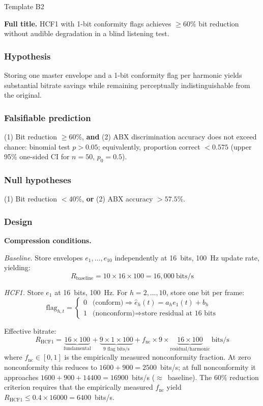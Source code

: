 \documentclass[11pt, a4paper]{article}
\newcommand{\hcf}{HCF1}
\begin{document}
\begin{predbox}{Template B2}

\textbf{Full title.}
\hcf{} with 1-bit conformity flags achieves $\geq\!60\%$ bit reduction without
audible degradation in a blind listening test.

\subsubsection{Hypothesis}

Storing one master envelope and a 1-bit conformity flag per harmonic yields
substantial bitrate savings while remaining perceptually indistinguishable from
the original.

\subsubsection{Falsifiable prediction}

(1) Bit reduction $\geq 60\%$, \textbf{and} (2) ABX discrimination accuracy does
not exceed chance: binomial test $p > 0.05$; equivalently, proportion correct
$< 0.575$ (upper 95\% one-sided CI for $n = 50$, $p_0 = 0.5$).

\subsubsection{Null hypotheses}

(1) Bit reduction $< 40\%$, \textbf{or} (2) ABX accuracy $> 57.5\%$.

\subsubsection{Design}

\textbf{Compression conditions.}

\emph{Baseline.}  Store envelopes $e_1, \ldots, e_{10}$ independently at 16~bits,
100~Hz update rate, yielding:
\[
  R_\text{baseline} = 10 \times 16 \times 100 = 16{,}000~\text{bits/s}
\]

\emph{\hcf{}.}  Store $e_1$ at 16~bits, 100~Hz.  For $h = 2, \ldots, 10$, store
one bit per frame:
\[
  \text{flag}_{h,t} = \begin{cases}
    0 & \text{(conform)} \Rightarrow \hat{e}_h(t) = a_h e_1(t) + b_h \\
    1 & \text{(nonconform)} \Rightarrow \text{store residual at 16 bits}
  \end{cases}
\]

Effective bitrate:
\[
  R_\text{HCF1} = \underbrace{16 \times 100}_{\text{fundamental}} +
                  \underbrace{9 \times 1 \times 100}_{\text{9 flag bits/s}} +
                  f_\text{nc} \times 9 \times \underbrace{16 \times 100}_{\text{residual/harmonic}}
                  ~\text{bits/s}
\]
where $f_\text{nc} \in [0,1]$ is the empirically measured nonconformity
fraction.  At zero nonconformity this reduces to $1600 + 900 = 2500$~bits/s;
at full nonconformity it approaches $1600 + 900 + 14400 = 16900$~bits/s
($\approx$~baseline).  The 60\% reduction criterion requires that the
empirically measured $f_\text{nc}$ yield $R_\text{HCF1} \leq 0.4 \times
16000 = 6400$~bits/s.


\end{predbox}
\end{document}
